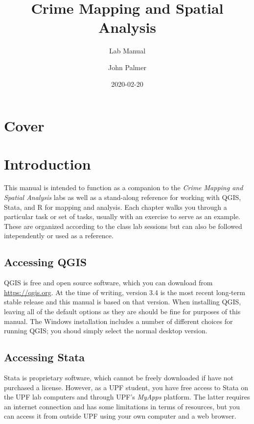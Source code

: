\documentclass[]{book}
\title{Crime Mapping and Spatial Analysis}
\subtitle{Lab Manual}
\author{John Palmer}
\date{2020-02-20}
\begin{document}
\maketitle

{
\setcounter{tocdepth}{1}
\tableofcontents
}
\hypertarget{cover}{%
\chapter*{Cover}\label{cover}}

\hypertarget{introduction}{%
\chapter*{Introduction}\label{introduction}}

This manual is intended to function as a companion to the \emph{Crime Mapping and Spatial Analysis} labs as well as a stand-along reference for working with QGIS, Stata, and R for mapping and analysis. Each chapter walks you through a particular task or set of tasks, usually with an exercise to serve as an example. These are organized according to the class lab sessions but can also be followed intependently or used as a reference.

\hypertarget{accessing-qgis}{%
\section*{Accessing QGIS}\label{accessing-qgis}}

QGIS is free and open source software, which you can download from \url{https://qgis.org}. At the time of writing, version 3.4 is the most recent long-term stable release and this manual is based on that version. When installing QGIS, leaving all of the default options as they are should be fine for purposes of this manual. The Windows installation includes a number of different choices for running QGIS; you shoud simply select the normal desktop version.

\hypertarget{accessing-stata}{%
\section*{Accessing Stata}\label{accessing-stata}}

Stata is proprietary software, which cannot be freely downloaded if have not purchased a license. However, as a UPF student, you have free access to Stata on the UPF lab computers and through UPF's \emph{MyApps} platform. The latter requires an internet connection and has some limitations in terms of resources, but you can access it from outside UPF using your own computer and a web browser.
\end{document}
